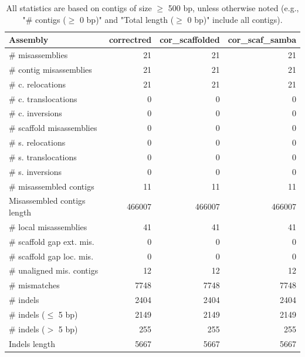 \documentclass[12pt,a4paper]{article}
\begin{document}
\begin{table}[ht]
\begin{center}
\caption{All statistics are based on contigs of size $\geq$ 500 bp, unless otherwise noted (e.g., "\# contigs ($\geq$ 0 bp)" and "Total length ($\geq$ 0 bp)" include all contigs).}
\begin{tabular}{|l*{3}{|r}|}
\hline
Assembly & correctred & cor\_scaffolded & cor\_scaf\_samba \\ \hline
\# misassemblies & 21 & 21 & 21 \\ \hline
\hspace{2mm}\# contig misassemblies & 21 & 21 & 21 \\ \hline
\hspace{5mm}\# c. relocations & 21 & 21 & 21 \\ \hline
\hspace{5mm}\# c. translocations & 0 & 0 & 0 \\ \hline
\hspace{5mm}\# c. inversions & 0 & 0 & 0 \\ \hline
\hspace{2mm}\# scaffold misassemblies & 0 & 0 & 0 \\ \hline
\hspace{5mm}\# s. relocations & 0 & 0 & 0 \\ \hline
\hspace{5mm}\# s. translocations & 0 & 0 & 0 \\ \hline
\hspace{5mm}\# s. inversions & 0 & 0 & 0 \\ \hline
\# misassembled contigs & 11 & 11 & 11 \\ \hline
Misassembled contigs length & 466007 & 466007 & 466007 \\ \hline
\# local misassemblies & 41 & 41 & 41 \\ \hline
\# scaffold gap ext. mis. & 0 & 0 & 0 \\ \hline
\# scaffold gap loc. mis. & 0 & 0 & 0 \\ \hline
\# unaligned mis. contigs & 12 & 12 & 12 \\ \hline
\# mismatches & 7748 & 7748 & 7748 \\ \hline
\# indels & 2404 & 2404 & 2404 \\ \hline
\hspace{5mm}\# indels ($\leq$ 5 bp) & 2149 & 2149 & 2149 \\ \hline
\hspace{5mm}\# indels ($>$ 5 bp) & 255 & 255 & 255 \\ \hline
Indels length & 5667 & 5667 & 5667 \\ \hline
\end{tabular}
\end{center}
\end{table}
\end{document}
